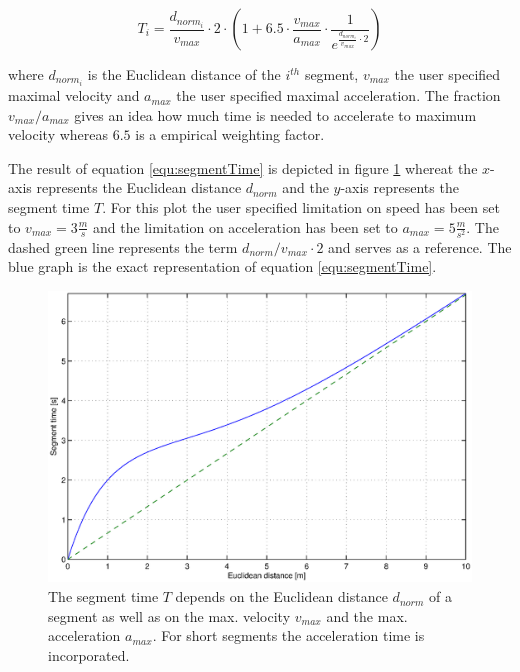 \begin{equation}
T_i = \frac{d_{norm_i}}{v_{max}} \cdot 2 \cdot \left( 1 + 6.5 \cdot \frac {v_{max}}{a_{max}} \cdot \frac{1}{e^{\frac{d_{norm_i}}{v_{max}} \cdot 2}} \right)
\label{equ:segmentTime}
\end{equation}

where $d_{norm_i}$ is the Euclidean distance of the $i^{th}$ segment, $v_{max}$ the user specified maximal velocity and $a_{max}$ the user specified maximal acceleration. The fraction $v_{max}/a_{max}$ gives an idea how much time is needed to accelerate to maximum velocity whereas $6.5$ is a empirical weighting factor. \newline

The result of equation \ref{equ:segmentTime} is depicted in figure \ref{pic:timeEstimation} whereat the $x$-axis represents the Euclidean distance $d_{norm}$ and the $y$-axis represents the segment time $T$. For this plot the user specified limitation on speed has been set to $v_{max} = 3 \frac{m}{s}$  and the limitation on acceleration has been set to  $a_{max} = 5 \frac{m}{s^2}$. The dashed green line represents the term $d_{norm}/v_{max} \cdot 2$ and serves as a reference. The blue graph is the exact representation of equation \ref{equ:segmentTime}. 

\begin{figure}[H]
   \centering
   \includegraphics[trim = 20mm 10mm 20mm 10mm,width=1\textwidth]{pics/time_estimation.eps}
   \caption{The segment time $T$ depends on the Euclidean distance $d_{norm}$ of a segment as well as on the max. velocity $v_{max}$ and the max. acceleration $a_{max}$. For short segments the acceleration time is incorporated.}
   \label{pic:timeEstimation}
\end{figure}

